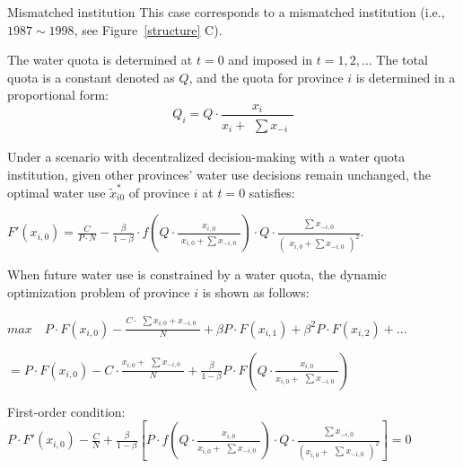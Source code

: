 \documentclass{../nsr}
\begin{document}
\begin{case} Mismatched institution
    This case corresponds to a mismatched institution (i.e., $1987\sim1998$, see Figure~\ref{structure} C).

    The water quota is determined at $t=0$ and imposed in $t=1,2,\ldots$ The total quota is a constant denoted as $Q$, and the quota for province $i$ is determined in a proportional form:
    $$Q_i=Q \cdot \frac{x_i}{x_i + \begin{matrix} \sum x_{-i} \end{matrix}}$$

    Under a scenario with decentralized decision-making with a water quota institution, given other provinces’ water use decisions remain unchanged, the optimal water use $\widetilde x_{i0}^*$ of province $i$ at $t=0$ satisfies:

    $F'(x_{i,0})=\frac{C}{P \cdot N} - \frac{\beta}{1-\beta} \cdot f(Q \cdot \frac{x_{i,0}}{\begin{matrix} x_{i,0} + \sum x_{-i,0} \end{matrix}}) \cdot Q \cdot \frac{\begin{matrix} \sum x_{-i,0} \end{matrix}}{(\begin{matrix} x_{i,0} + \sum x_{-i,0} \end{matrix})^2}$.

    When future water use is constrained by a water quota, the dynamic optimization problem of province $i$ is shown as follows:

    $max  \quad P \cdot F(x_{i,0})-\frac{C \cdot \begin{matrix} \sum x_{i,0} + x_{-i,0} \end{matrix}}{N}+\beta P \cdot F(x_{i,1})+\beta^2 P \cdot F(x_{i,2})+...$

    $=P \cdot F(x_{i,0})-C \cdot \frac{x_{i,0} + \begin{matrix} \sum x_{-i,0} \end{matrix}}{N}+\frac{\beta}{1-\beta} P \cdot F(Q \cdot \frac{x_{i,0}}{x_{i,0} + \begin{matrix} \sum x_{-i,0} \end{matrix}})$

    First-order condition: $P \cdot F'(x_{i,0})-\frac{C}{N}+\frac{\beta}{1-\beta}[P \cdot f(Q \cdot \frac{x_{i,0}}{x_{i,0} + \begin{matrix} \sum x_{-i,0} \end{matrix}}) \cdot Q \cdot \frac{\begin{matrix} \sum x_{-i,0} \end{matrix}}{(x_{i,0}+\begin{matrix} \sum  x_{-i,0} \end{matrix})^2}]=0$


\end{case}
\end{document}
